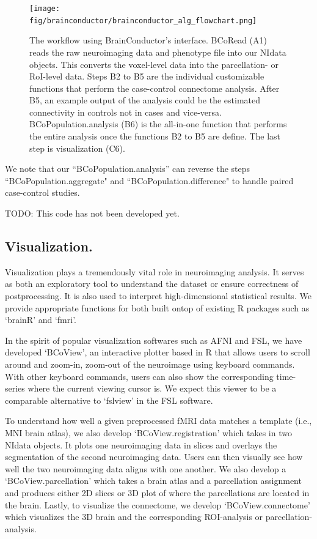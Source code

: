 \documentclass{nature}
\begin{document}
\begin{figure}[tb]
\centering
\texttt{[image: fig/brainconductor/brainconductor\_alg\_flowchart.png]}
\caption{The workflow using BrainConductor's interface. BCoRead (A1) reads the
raw neuroimaging
data and phenotype file into our NIdata objects. This
converts the voxel-level data into the parcellation- or RoI-level
data. Steps B2 to B5 are the individual
customizable functions that perform the case-control connectome analysis.
After B5, an example output of the analysis could be
the estimated connectivity in controls not in cases and vice-versa.
 BCoPopulation.analysis (B6) is the all-in-one function that performs the entire
analysis
once the functions B2 to B5 are define. The last step is visualization (C6).}
\label{fig:flowchart}
\end{figure}

We note that our ``BCoPopulation.analysis'' can reverse the steps
``BCoPopulation.aggregate"
and ``BCoPopulation.difference" to handle paired case-control studies.

{\color{red}TODO: This code has not been developed yet.}

\subsection{Visualization.}
Visualization plays a tremendously vital role in neuroimaging analysis.
It serves as both an exploratory tool to understand the dataset or ensure
correctness
of postprocessing. It is also used to interpret high-dimensional statistical
results.
We provide appropriate functions for both built ontop of existing R packages
such
as `brainR' and `fmri'.

In the spirit of popular visualization softwares such as AFNI and FSL, we have
developed `BCoView', an interactive plotter based in R that allows users to
scroll around and
zoom-in, zoom-out of the neuroimage using keyboard commands. With other keyboard
commands, users can also show the corresponding time-series where the current
viewing
cursor is. We expect this viewer to be a comparable alternative to `fslview' in
the FSL
software.

To understand how well a given preprocessed fMRI data matches a template (i.e.,
MNI brain
atlas), we also develop `BCoView.registration' which takes in two NIdata
objects.
It plots one neuroimaging data in slices and overlays the segmentation of the
second
neuroimaging data. Users can then visually see how well the two neuroimaging
data aligns
with one another. We also develop a `BCoView.parcellation' which takes a brain
atlas and
a parcellation assignment and produces either 2D slices or 3D plot of where the
parcellations
are located in the brain.
Lastly, to visualize the connectome, we develop `BCoView.connectome' which
visualizes the
3D brain and the corresponding ROI-analysis or parcellation-analysis.
\end{document}
